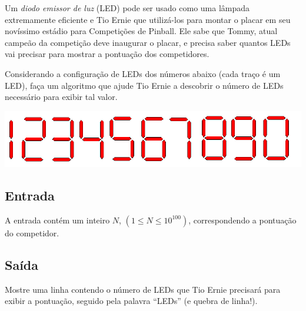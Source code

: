 
%
%
%
%

Um \emph{diodo emissor de luz} (LED) pode ser usado como uma lâmpada extremamente
eficiente e Tio Ernie que utilizá-los para montar o placar em seu novíssimo estádio
para Competições de Pinball. Ele sabe que Tommy, atual campeão da competição deve
inaugurar o placar, e precisa saber quantos LEDs vai precisar para mostrar a
pontuação dos competidores.

Considerando a configuração de LEDs dos números abaixo (cada traço é um LED),
faça um algoritmo que ajude Tio Ernie a descobrir o número de LEDs necessário
para exibir tal valor.

\begin{center}
\includegraphics[width=.8\textwidth]{leds}%
\end{center}%

\subsection*{Entrada}%
A entrada contém um inteiro $N$, $(1 \leq N \leq 10^{100})$, correspondendo a
pontuação do competidor.

\subsection*{Saída}%
Mostre uma linha contendo o número de LEDs que Tio Ernie precisará para exibir a
pontuação, seguido pela palavra ``LEDs'' (e quebra de linha!).

%